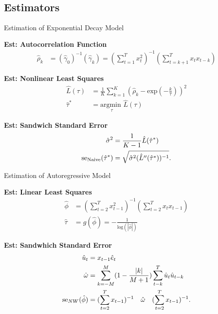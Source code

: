 \documentclass[12pt]{beamer}
\begin{document}
\subsection{Estimators}
\begin{frame}{Estimation of Exponential Decay Model}
\scriptsize

\textbf{Est: Autocorrelation Function}
\begin{align}
    \hat\rho_k &= (\hat\gamma_0)^{-1}(\hat\gamma_k) = (\sum_{t=1}^T x_t^2)^{-1} (\sum_{t=k+1}^{T}x_t x_{t-k})
\end{align}

\textbf{Est: Nonlinear Least Squares}
\begin{align}
    \hat L(\tau) &= \frac{1}{K} \sum_{k=1}^K (\hat\rho_k - \text{exp}(-\frac{k}{\tau}))^2\\
    \hat\tau^* &= \underset{\tau}{\text{argmin }} \hat L(\tau)
\end{align}

\textbf{Est: Sandwich Standard Error}
\begin{align}
    \hat\sigma^2 &= \frac{1}{K-1} \hat L(\hat\tau^*) \notag\\
    \text{se}_\text{Naive}(\hat\tau^*) &= \sqrt{\hat\sigma^2 (\hat L''(\hat\tau^*))^{-1}}.
\end{align}
\end{frame}

\begin{frame}{Estimation of Autoregressive Model}
\scriptsize

\textbf{Est: Linear Least Squares}
\begin{align}
    \hat\phi &= (\sum_{t=2}^T x_{t-1}^2)^{-1} (\sum_{t=2}^T x_t x_{t-1})\\
    \hat\tau &= g(\hat\phi) = -\frac{1}{\text{log}(|\hat\phi|)}
\end{align}

\textbf{Est: Sandwhich Standard Error}
\begin{align}
    \hat u_t &= x_{t-1} \hat e_t \notag\\
    \hat \omega &= \sum_{k=-M}^M (1 - \frac{|k|}{M+1}) \sum_{t-k}^T \hat u_t \hat u_{t-k} \notag\\
    \text{se}_{NW}(\hat\phi) &= (\sum_{t=2}^T x_{t-1})^{-1} \quad \hat \omega \quad (\sum_{t=2}^T x_{t-1})^{-1}.
\end{align}

\end{frame}
\end{document}
